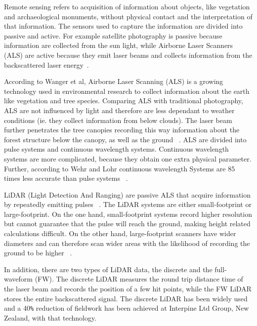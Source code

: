 \documentclass{subfiles}
\begin{document}
	\par Remote sensing refers to acquisition of information about objects, like vegetation and archaeological monuments, without physical contact and the interpretation of that information.  The sensors used to capture the information are divided into passive and active. For example satellite photography is passive because information are collected from the sun light, while Airborne Laser Scanners (ALS) are active because they emit laser beams and collects information from the backscattered laser energy~\cite{Smith2012}.
	
	\par According to Wanger et al, Airborne Laser Scanning (ALS) is a growing technology used in environmental research to collect information about the earth like vegetation and tree species. Comparing ALS with traditional photography, ALS are not influenced by light and therefore are less dependant to weather conditions (ie. they collect information from below clouds). The laser beam further penetrates the tree canopies recording this way information about the forest structure below the canopy, as well as the ground ~\cite{Wanger2004}. ALS are divided into pulse systems and continuous wavelength systems. Continuous wavelength systems are more complicated, because they obtain one extra physical parameter. Further, according to Wehr and Lohr continuous wavelength Systems are 85 times less accurate than pulse systems ~\cite{Wehr1999}.
	
	\par LiDAR (Light Detection And Ranging) are passive ALS that acquire information by repeatedly emitting pulses ~\cite{Wehr1999}. The LiDAR systems are either small-footprint or large-footprint. On the one hand, small-footprint systems record higher resolution but cannot guarantee that the pulse will reach the ground, making height related calculations difficult. On the other hand, large-footprint scanners have wider diameters and can therefore scan wider areas with the likelihood of recording the ground to be higher ~\cite{Mallet2009}. 
	
	\par In addition, there are two types of LiDAR data, the discrete and the full-waveform (FW). The discrete LiDAR measures the round trip distance time of the laser beam and records the position of a few hit points, while the FW LiDAR stores the entire backscattered signal. The discrete LiDAR has been widely used and a 40\verb|%| reduction of fieldwork has been achieved at Interpine Ltd Group, New Zealand, with that technology. 
	
\end{document}
